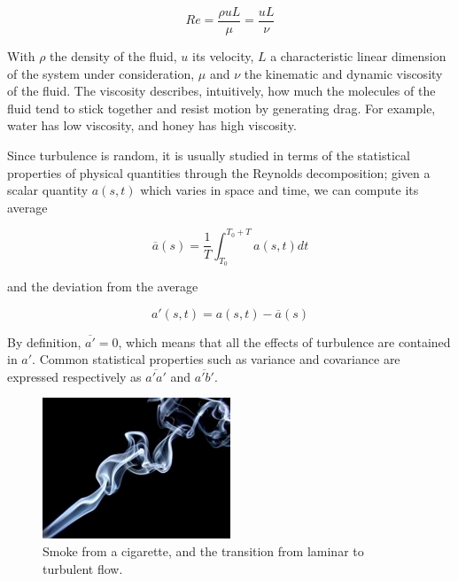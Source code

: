\documentclass[a4paper,11pt]{kth-mag}
\begin{document}
$$
Re=\frac{\rho u L}{\mu}=\frac{uL}{\nu}
$$

With $\rho$ the density of the fluid, $u$ its velocity, $L$ a characteristic linear dimension of the system under consideration, $\mu$ and $\nu$ the kinematic and dynamic viscosity of the fluid. The viscosity describes, intuitively, how much the molecules of the fluid tend to stick together and resist motion by generating drag. For example, water has low viscosity, and honey has high viscosity.

Since turbulence is random, it is usually studied in terms of the statistical properties of physical quantities through the Reynolds decomposition; given a scalar quantity $a(s,t)$ which varies in space and time, we can compute its average

$$
\overline{a}(s)=\frac{1}{T}\int_{T_0}^{T_0+T}a(s,t)dt
$$

\noindent and the deviation from the average

$$
a'(s,t)=a(s,t)-\overline{a}(s)
$$

By definition, $\overline{a'}=0$, which means that all the effects of turbulence are contained in $a'$. Common statistical properties such as variance and covariance are expressed respectively as $\overline{a'a'}$ and $\overline{a'b'}$.

\begin{figure}
\caption{Smoke from a cigarette, and the transition from laminar to turbulent flow.}
\label{fig:smoke}
\centering
\includegraphics[width=0.5\textwidth]{images/smoke}
\end{figure}
\end{document}
